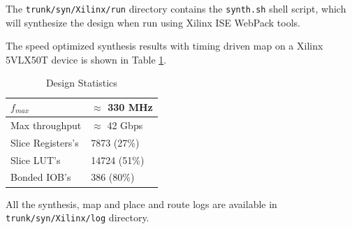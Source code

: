 \documentclass[a4paper]{article}
\begin{document}
The \texttt{trunk/syn/Xilinx/run} directory contains the \texttt{synth.sh} shell script, which will synthesize the design when run using Xilinx ISE WebPack tools.

The speed optimized synthesis results with timing driven map on a Xilinx 5VLX50T device is shown in Table \ref{stats}.
\begin{table}[h]
\centering
	\begin{tabular}{|l|l|}
	\hline
	$f_{max}$ & $\approx$ 330 MHz  \\
	\hline
	Max throughput & $\approx$ 42 Gbps  \\
	\hline
	Slice Registers's & 7873 (27\%) \\
	\hline
	Slice LUT's & 14724 (51\%) \\
	\hline
	Bonded IOB's & 386 (80\%) \\
	\hline
	\end{tabular}
	\caption{Design Statistics}
	\label{stats}
\end{table}

All the synthesis, map and place and route logs are available in \texttt{trunk/syn/Xilinx/log} directory.
\end{document}
